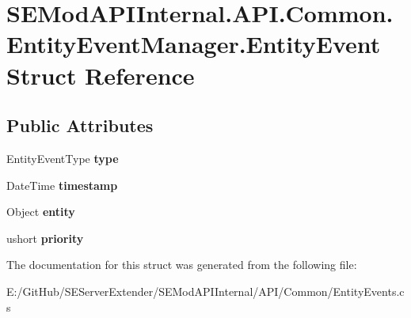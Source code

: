 \hypertarget{struct_s_e_mod_a_p_i_internal_1_1_a_p_i_1_1_common_1_1_entity_event_manager_1_1_entity_event}{}\section{S\+E\+Mod\+A\+P\+I\+Internal.\+A\+P\+I.\+Common.\+Entity\+Event\+Manager.\+Entity\+Event Struct Reference}
\label{struct_s_e_mod_a_p_i_internal_1_1_a_p_i_1_1_common_1_1_entity_event_manager_1_1_entity_event}
\subsection*{Public Attributes}
\begin{DoxyCompactItemize}
\item 
\hypertarget{struct_s_e_mod_a_p_i_internal_1_1_a_p_i_1_1_common_1_1_entity_event_manager_1_1_entity_event_a91a6578a74671fd4fd7c4c7792ad6d82}{}Entity\+Event\+Type {\bfseries type}\label{struct_s_e_mod_a_p_i_internal_1_1_a_p_i_1_1_common_1_1_entity_event_manager_1_1_entity_event_a91a6578a74671fd4fd7c4c7792ad6d82}

\item 
\hypertarget{struct_s_e_mod_a_p_i_internal_1_1_a_p_i_1_1_common_1_1_entity_event_manager_1_1_entity_event_ab0b081549efc41feacda4910089aeb08}{}Date\+Time {\bfseries timestamp}\label{struct_s_e_mod_a_p_i_internal_1_1_a_p_i_1_1_common_1_1_entity_event_manager_1_1_entity_event_ab0b081549efc41feacda4910089aeb08}

\item 
\hypertarget{struct_s_e_mod_a_p_i_internal_1_1_a_p_i_1_1_common_1_1_entity_event_manager_1_1_entity_event_a50d4bc17ff8f5540dc9d49a9252c4168}{}Object {\bfseries entity}\label{struct_s_e_mod_a_p_i_internal_1_1_a_p_i_1_1_common_1_1_entity_event_manager_1_1_entity_event_a50d4bc17ff8f5540dc9d49a9252c4168}

\item 
\hypertarget{struct_s_e_mod_a_p_i_internal_1_1_a_p_i_1_1_common_1_1_entity_event_manager_1_1_entity_event_aa2bc20e64fff2e20930824b6ebe66663}{}ushort {\bfseries priority}\label{struct_s_e_mod_a_p_i_internal_1_1_a_p_i_1_1_common_1_1_entity_event_manager_1_1_entity_event_aa2bc20e64fff2e20930824b6ebe66663}

\end{DoxyCompactItemize}


The documentation for this struct was generated from the following file\+:\begin{DoxyCompactItemize}
\item 
E\+:/\+Git\+Hub/\+S\+E\+Server\+Extender/\+S\+E\+Mod\+A\+P\+I\+Internal/\+A\+P\+I/\+Common/Entity\+Events.\+cs\end{DoxyCompactItemize}
